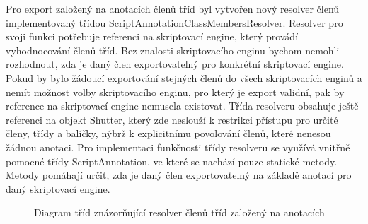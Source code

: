 Pro export založený na anotacích členů tříd byl vytvořen nový resolver členů implementovaný třídou ScriptAnnotationClassMembersResolver. Resolver pro svoji funkci potřebuje referenci na skriptovací engine, který provádí vyhodnocování členů tříd. Bez znalosti skriptovacího enginu bychom nemohli rozhodnout, zda je daný člen exportovatelný pro konkrétní skriptovací engine. Pokud by bylo žádoucí exportování stejných členů do všech skriptovacích enginů a nemít možnost volby skriptovacího enginu, pro který je export validní, pak by reference na skriptovací engine nemusela existovat. Třída resolveru obsahuje ještě referenci na objekt Shutter, který zde neslouží k restrikci přístupu pro určité členy, třídy a balíčky, nýbrž k explicitnímu povolování členů, které nenesou žádnou anotaci. Pro implementaci funkčnosti třídy resolveru se využívá vnitřně pomocné třídy ScriptAnnotation, ve které se nachází pouze statické metody. Metody pomáhají určit, zda je daný člen exportovatelný na základě anotací pro daný skriptovací engine.

\begin{figure}[H]
  \begin{center}
    \caption{Diagram tříd znázorňující resolver členů tříd založený na anotacích}
    \label{Figure.AnnotationClassMembersResolver}
  \end{center}
\end{figure}

